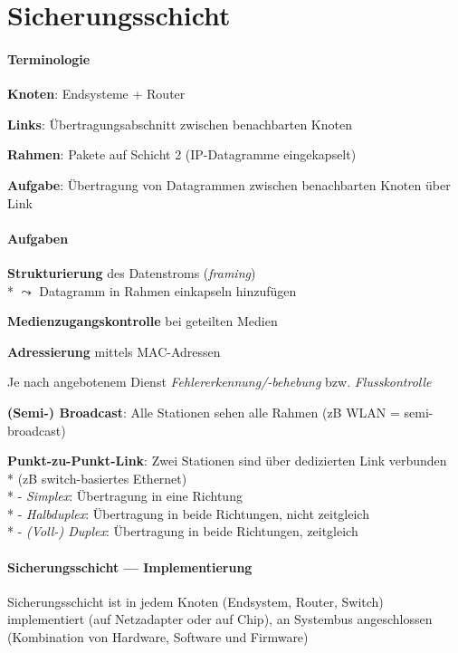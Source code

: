 \section{Sicherungsschicht}

\paragraph{Terminologie}
\begin{items}
  \item \textbf{Knoten}: Endsysteme + Router
  \item \textbf{Links}: Übertragungsabschnitt zwischen benachbarten Knoten
  \item \textbf{Rahmen}: Pakete auf Schicht 2 (IP-Datagramme eingekapselt)
  \item \textbf{Aufgabe}: Übertragung von Datagrammen zwischen benachbarten Knoten über Link
\end{items}

\paragraph{Aufgaben}
\begin{items}
  \item \textbf{Strukturierung} des Datenstroms (\emph{framing}) \\*
    \( \leadsto \) Datagramm in Rahmen einkapseln hinzufügen
  \item \textbf{Medienzugangskontrolle} bei geteilten Medien
  \item \textbf{Adressierung} mittels MAC-Adressen
  \item Je nach angebotenem Dienst \emph{Fehlererkennung/-behebung} bzw. \emph{Flusskontrolle}
	\medskip
  \item \textbf{(Semi-) Broadcast}: Alle Stationen sehen alle Rahmen (zB WLAN = semi-broadcast)
  \item \textbf{Punkt-zu-Punkt-Link}: Zwei Stationen sind über dedizierten Link verbunden \\*
  	 (zB switch-basiertes Ethernet)\\*
	  - \emph{Simplex}: Übertragung in eine Richtung\\*
  	  - \emph{Halbduplex}: Übertragung in beide Richtungen, nicht zeitgleich\\*
      - \emph{(Voll-) Duplex}: Übertragung in beide Richtungen, zeitgleich
\end{items}

\paragraph{Sicherungsschicht --- Implementierung}
\begin{items}
  \item Sicherungsschicht ist in jedem Knoten (Endsystem, Router, Switch) implementiert (auf Netzadapter oder auf Chip), an Systembus angeschlossen (Kombination von Hardware, Software und Firmware)
\end{items}

